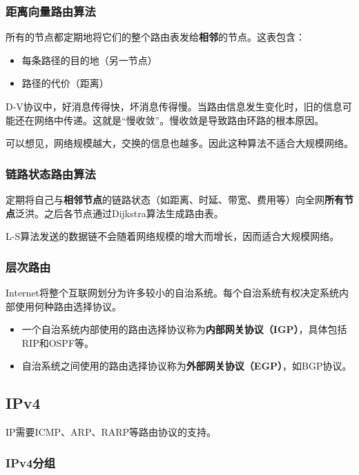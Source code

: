 \documentclass[12pt, a4paper, oneside]{ctexart}
\begin{document}
\subsubsection{距离向量路由算法}

所有的节点都定期地将它们的整个路由表发给\textbf{相邻}的节点。这表包含：
\begin{itemize}
    \item 每条路径的目的地（另一节点）
    \item 路径的代价（距离）
\end{itemize}

D-V协议中，好消息传得快，坏消息传得慢。当路由信息发生变化时，旧的信息可能还在网络中传递。这就是“慢收敛”。慢收敛是导致路由环路的根本原因。

可以想见，网络规模越大，交换的信息也越多。因此这种算法不适合大规模网络。

\subsubsection{链路状态路由算法}

定期将自己与\textbf{相邻节点}的链路状态（如距离、时延、带宽、费用等）向全网\textbf{所有节点}泛洪。之后各节点通过Dijkstra算法生成路由表。

L-S算法发送的数据链不会随着网络规模的增大而增长，因而适合大规模网络。

\subsubsection{层次路由}

Internet将整个互联网划分为许多较小的自治系统。每个自治系统有权决定系统内部使用何种路由选择协议。
\begin{itemize}
    \item 一个自治系统内部使用的路由选择协议称为\textbf{内部网关协议（IGP）}，具体包括RIP和OSPF等。
    \item 自治系统之间使用的路由选择协议称为\textbf{外部网关协议（EGP）}，如BGP协议。
\end{itemize}

\subsection{IPv4}

IP需要ICMP、ARP、RARP等路由协议的支持。

\subsubsection{IPv4分组}
\end{document}
